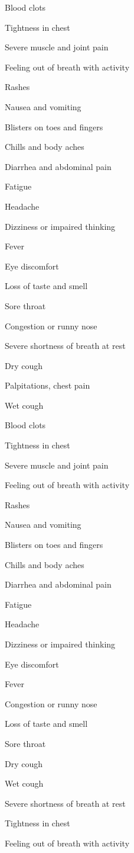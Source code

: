 Blood clots

Tightness in chest

Severe muscle and joint pain

Feeling out of breath with activity

Rashes

Nausea and vomiting

Blisters on toes and fingers

Chills and body aches

Diarrhea and abdominal pain

Fatigue

Headache

Dizziness or impaired thinking

Fever

Eye discomfort

Loss of taste and smell

Sore throat

Congestion or runny nose

Severe shortness of breath at rest

Dry cough

Palpitations, chest pain

Wet cough

Blood clots

Tightness in chest

Severe muscle and joint pain

Feeling out of breath with activity

Rashes

Nausea and vomiting

Blisters on toes and fingers

Chills and body aches

Diarrhea and abdominal pain

Fatigue

Headache

Dizziness or impaired thinking

Eye discomfort

Fever

Congestion or runny nose

Loss of taste and smell

Sore throat

Dry cough

Wet cough

Severe shortness of breath at rest

Tightness in chest

Feeling out of breath with activity

